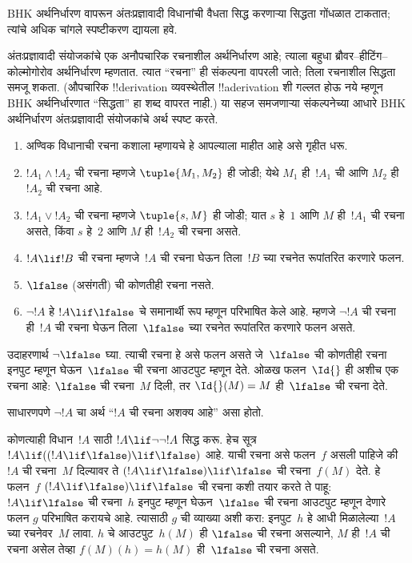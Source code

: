 \documentclass[../../../include/open-logic-section]{subfiles}
\begin{document}


\begin{editorial}
  BHK अर्थनिर्धारण वापरून अंतःप्रज्ञावादी विधानांची
  वैधता सिद्ध करणाऱ्या सिद्धता गोंधळात टाकतात;
  त्यांचे अधिक चांगले स्पष्टीकरण द्यायला हवे.
\end{editorial}

अंतःप्रज्ञावादी संयोजकांचे एक अनौपचारिक रचनाशील
अर्थनिर्धारण आहे; त्याला बहुधा ब्रौवर--हीटिंग--कोल्मोगोरोव
अर्थनिर्धारण म्हणतात. त्यात ``रचना'' ही संकल्पना
वापरली जाते; तिला रचनाशील सिद्धता समजू शकता.
(औपचारिक !!{derivation} व्यवस्थेतील
!!a{derivation} शी गल्लत होऊ नये म्हणून BHK
अर्थनिर्धारणात ``सिद्धता'' हा शब्द वापरत नाही.)
या सहज समजणाऱ्या संकल्पनेच्या आधारे BHK अर्थनिर्धारण
अंतःप्रज्ञावादी संयोजकांचे अर्थ स्पष्ट करते.

\begin{enumerate}
\item अण्विक विधानाची रचना कशाला म्हणायचे हे आपल्याला
  माहीत आहे असे गृहीत धरू.
\item $!A_1 \land !A_2$ ची रचना म्हणजे $\tuple{M_1, M_2}$
  ही जोडी; येथे $M_1$ ही~$!A_1$ ची आणि $M_2$ ही~$!A_2$
  ची रचना आहे.
\item $!A_1 \lor !A_2$ ची रचना म्हणजे $\tuple{s, M}$
  ही जोडी; यात $s$ हे~$1$ आणि $M$ ही~$!A_1$ ची रचना
  असते, किंवा $s$ हे~$2$ आणि $M$ ही~$!A_2$ ची रचना
  असते.
\item $!A \lif !B$ ची रचना म्हणजे~$!A$ ची रचना
  घेऊन तिला~$!B$ च्या रचनेत रूपांतरित करणारे फलन.
\item $\lfalse$ (असंगती) ची कोणतीही रचना नसते.
\item $\lnot !A$ हे $!A \lif \lfalse$ चे समानार्थी रूप
  म्हणून परिभाषित केले आहे. म्हणजे $\lnot !A$ ची रचना
  ही~$!A$ ची रचना घेऊन तिला~$\lfalse$ च्या रचनेत
  रूपांतरित करणारे फलन असते.
\end{enumerate}

\begin{ex}
उदाहरणार्थ $\lnot \lfalse$ घ्या. त्याची रचना हे
असे फलन असते जे~$\lfalse$ ची कोणतीही रचना इनपुट
म्हणून घेऊन~$\lfalse$ ची रचना आउटपुट म्हणून देते.
ओळख फलन~$\Id{}$ ही अशीच एक रचना आहे:
$\lfalse$ ची रचना~$M$ दिली, तर $\Id{}(M) = M$
ही~$\lfalse$ ची रचना देते.
\end{ex}

साधारणपणे $\lnot !A$ चा अर्थ ``$!A$ ची रचना अशक्य आहे'' असा होतो.

\begin{ex}
कोणत्याही विधान~$!A$ साठी $!A \lif \lnot \lnot !A$
सिद्ध करू. हेच सूत्र $!A \lif ((!A \lif \lfalse) \lif
\lfalse)$ आहे. याची रचना असे फलन~$f$ असली पाहिजे
की $!A$ ची रचना~$M$ दिल्यावर ते $(!A \lif \lfalse)
\lif \lfalse$ ची रचना~$f(M)$ देते. हे फलन~$f$
$(!A \lif \lfalse) \lif \lfalse$ ची रचना कशी
तयार करते ते पाहू: $!A \lif \lfalse$
ची रचना~$h$ इनपुट म्हणून घेऊन~$\lfalse$ ची रचना
आउटपुट म्हणून देणारे फलन $g$ परिभाषित करायचे आहे.
त्यासाठी $g$ ची व्याख्या अशी करा: इनपुट~$h$ हे
आधी मिळालेल्या~$!A$ च्या
रचनेवर~$M$ लावा. $h$ चे आउटपुट~$h(M)$ ही
$\lfalse$ ची रचना असल्याने, $M$ ही~$!A$ ची रचना
असेल तेव्हा $f(M)(h) = h(M)$ ही~$\lfalse$ ची रचना
असते.
\end{ex}
\end{document}
